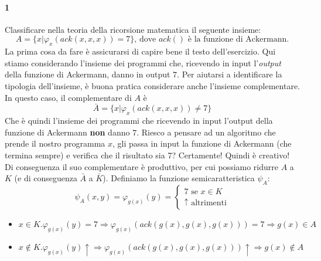 \documentclass[a4paper,oneside]{scrbook}
\begin{document}
\paragraph{1} Classificare nella teoria della ricorsione matematica il seguente insieme:
\begin{equation*}
	A=\{x|\varphi_x(ack(x,x,x))=7\} \text{, dove $ack()$ è la funzione di Ackermann.}
\end{equation*}
La prima cosa da fare è assicurarsi di capire bene il testo dell'esercizio.
Qui stiamo considerando l'insieme dei programmi che, ricevendo in input l'\textit{output} della funzione di Ackermann, danno in output $7$.
Per aiutarsi a identificare la tipologia dell'insieme, è buona pratica considerare anche l'insieme complementare. In questo caso, il complementare di $A$ è
$$\bar{A}=\{x|\varphi_x(ack(x,x,x))\ne 7\}$$
Che è quindi l'insieme dei programmi che ricevendo in input l'output della funzione di Ackermann \textbf{non} danno $7$.
Riesco a pensare ad un algoritmo che prende il nostro programma $x$, gli passa in input la funzione di Ackermann (che termina sempre) e verifica che il risultato sia 7?
Certamente! Quindi è creativo! Di conseguenza il suo complementare è produttivo, per cui possiamo ridurre $A$ a $K$ (e di conseguenza $\bar{A}$ a $\bar{K}$).
Definiamo la funzione semicaratteristica $\psi_A$:
\begin{equation*}
	\psi_A(x,y)=
	\varphi_{g(x)}(y)=
	\begin{cases}
		7 \text{ se } x \in K\\
		\uparrow \text{ altrimenti}
	\end{cases}
\end{equation*}
\begin{itemize}
	\item $x\in K.\varphi_{g(x)}(y)=7 \Rightarrow \varphi_{g(x)}(ack(g(x),g(x),g(x)))=7 \Rightarrow g(x) \in A$
	\item $x\notin K.\varphi_{g(x)}(y)\uparrow \Rightarrow \varphi_{g(x)}(ack(g(x),g(x),g(x)))\uparrow \Rightarrow g(x) \notin A$ 
\end{itemize}
\end{document}
